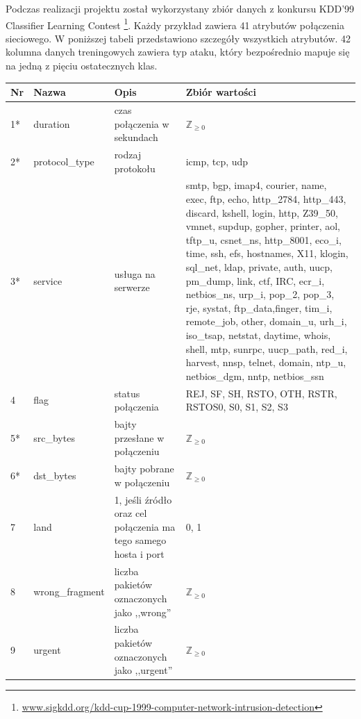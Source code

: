 \documentclass[a4paper, 12pt]{article}
\begin{document}
Podczas realizacji projektu został wykorzystany zbiór danych z konkursu 
KDD'99 Classifier Learning Contest
\footnote{\url{www.sigkdd.org/kdd-cup-1999-computer-network-intrusion-detection}}.
Każdy przykład zawiera 41 atrybutów połączenia sieciowego. W poniższej tabeli przedstawiono
szczegóły wszystkich atrybutów.
42 kolumna danych treningowych zawiera typ ataku, który bezpośrednio mapuje się na
jedną z pięciu ostatecznych klas. \\

\begin{tabular}{ | l | p{3cm} | p{3cm} | p{6cm} | } \hline
Nr & Nazwa & Opis & Zbiór wartości \\ \hline
1*      & duration & czas połączenia w sekundach & $\mathbb Z_{\ge 0}$ \\ \hline
2*      & protocol\_type & rodzaj protokołu & icmp, tcp, udp \\ \hline
3*      & service & usługa na serwerze & smtp, bgp, imap4, courier, name, exec, ftp, echo, http\_2784,
                       http\_443, discard, kshell, login, http, Z39\_50, vmnet, supdup,
                       gopher, printer, aol, tftp\_u, csnet\_ns, http\_8001, eco\_i, time,
                       ssh, efs, hostnames, X11, klogin, sql\_net, ldap, private,
                       auth, uucp, pm\_dump, link, ctf, IRC, ecr\_i, netbios\_ns, urp\_i,
                       pop\_2, pop\_3, rje, systat, ftp\_data,finger, tim\_i, remote\_job,
                       other, domain\_u, urh\_i, iso\_tsap, netstat, daytime, whois, shell,
                       mtp, sunrpc, uucp\_path, red\_i, harvest, nnsp, telnet, domain,
                       ntp\_u, netbios\_dgm, nntp, netbios\_ssn \\ \hline
4      & flag & status połączenia & REJ, SF, SH, RSTO, OTH, RSTR, RSTOS0, S0, S1, S2, S3 \\ \hline
5*      & src\_bytes  & bajty przesłane w połączeniu & $\mathbb Z_{\ge 0}$ \\ \hline
6*      & dst\_bytes  & bajty pobrane w połączeniu  & $\mathbb Z_{\ge 0}$ \\ \hline
7      & land & 1, jeśli źródło oraz cel połączenia ma tego samego hosta i port & 0, 1 \\ \hline
8      & wrong\_fragment  & liczba pakietów oznaczonych jako ,,wrong'' & $\mathbb Z_{\ge 0}$ \\ \hline
9      & urgent  & liczba pakietów oznaczonych jako ,,urgent''  & $\mathbb Z_{\ge 0}$ \\ \hline
\end{tabular}
\end{document}
